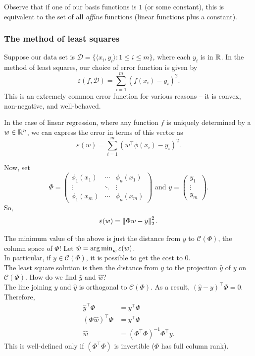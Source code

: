 \documentclass{article}
\begin{document}
		Observe that if one of our basis functions is $1$ (or some constant), this is equivalent to the set of all \emph{affine} functions (linear functions plus a constant).


		\subsubsection{The method of least squares}

			\label{subsubsec: the method of least squares}

			Suppose our data set is $\mathcal{D} = \{\langle x_i,y_i\rangle : 1 \le i \le m\}$, where each $y_i$ is in $\mathbb{R}$. In the method of least squares, our choice of error function is given by
			\[ \varepsilon(f,\mathcal{D}) = \sum_{i=1}^m (f(x_i) - y_i)^2. \]
			This is an extremely common error function for various reasons -- it is convex, non-negative, and well-behaved.

			In the case of linear regression, where any function $f$ is uniquely determined by a $w\in \mathbb{R}^n$, we can express the error in terms of this vector as
			\[ \varepsilon(w) = \sum_{i=1}^m (w^\top \phi(x_i) - y_i)^2. \]

			Now, set
			\[
				\Phi =
				\begin{pmatrix}
					\phi_1(x_1) & \cdots & \phi_n(x_1) \\
					\vdots & \ddots & \vdots \\
					\phi_1(x_m) & \cdots & \phi_n(x_m)
				\end{pmatrix}
				\text{ and }
				y =
				\begin{pmatrix}
					y_1 \\
					\vdots \\
					y_m
				\end{pmatrix}.
			\]
			So,
			\[ \varepsilon(w) = \left\lVert\Phi w - y\right\rVert_2^2. \]

			The minimum value of the above is just the distance from $y$ to $\mathcal{C}(\Phi)$, the column space of $\Phi$! Let $\hat{w} = \operatorname*{arg\,min}_{w} \varepsilon(w)$.\\
			In particular, if $y\in\mathcal{C}(\Phi)$, it is possible to get the cost to $0$.\\
			The least square solution is then the distance from $y$ to the projection $\hat{y}$ of $y$ on $\mathcal{C}(\Phi)$. How do we find $\hat{y}$ and $\hat{w}$?\\
			The line joining $y$ and $\hat{y}$ is orthogonal to $\mathcal{C}(\Phi)$. As a result, $(\hat{y} - y)^\top \Phi = 0$. Therefore,
			\begin{align*}
				\hat{y}^\top \Phi &= y^\top \Phi \\
				(\Phi \hat{w})^\top \Phi &= y^\top \Phi \\
				\hat{w} &= (\Phi^\top \Phi)^{-1} \Phi^\top y.
			\end{align*}
			This is well-defined only if $(\Phi^\top \Phi)$ is invertible ($\Phi$ has full column rank).
\end{document}
